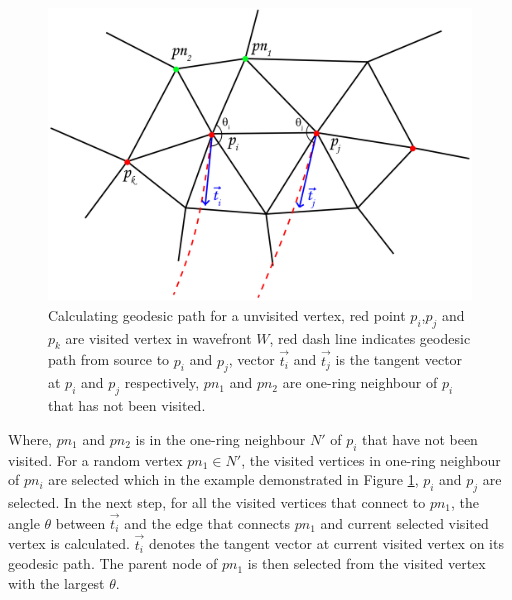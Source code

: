 \begin{figure}[H]
    \centering
    \includegraphics[width=0.9\columnwidth]{../images/geodesic_image/select_parent}
    \caption[Formation of an initial path for a unvisited vertex]{Calculating geodesic path for a unvisited vertex, red point $p_{i}$,$p_{j}$ and $p_{k}$ are visited vertex in wavefront $W$, red dash line indicates geodesic path from source to $p_{i}$ and $p_{j}$, vector $\vec{t_{i}}$ and $\vec{t_{j}}$ is the tangent vector at $p_{i}$ and $p_{j}$ respectively, $pn_{1}$ and $pn_{2}$ are one-ring neighbour of $p_{i}$ that has not been visited.}
    \label{figure:geodesic_select_parent}
\end{figure}

Where, $pn_{1}$ and $pn_{2}$ is in the one-ring neighbour $N'$ of $p_{i}$ that have not been visited. For a random vertex $pn_{1} \in N'$, the visited vertices in one-ring neighbour of $pn_{i}$ are selected which in the example demonstrated in Figure \ref{figure:geodesic_select_parent}, $p_{i}$ and $p_{j}$ are selected. In the next step, for all the visited vertices that connect to $pn_{1}$, the angle $ \theta $ between $\vec{t_{i}}$ and the edge that connects $pn_{1}$ and current selected visited vertex is calculated. $\vec{t_{i}}$ denotes the tangent vector at current visited vertex on its geodesic path. The parent node of $pn_{1}$ is then selected from the visited vertex with the largest $\theta$. 

